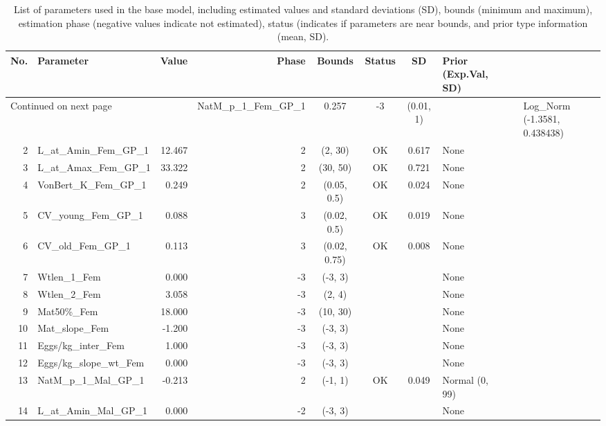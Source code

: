 \documentclass[12pt,]{article}
\begin{document}
\begin{landscape}
\begin{longtable}{rlrrcccl}
\caption{List of parameters used in
                                              the base model, including estimated 
                                              values and standard deviations (SD), 
                                              bounds (minimum and maximum), 
                                              estimation phase (negative values indicate
                                              not estimated), status (indicates if 
                                              parameters are near bounds, and prior type
                                              information (mean, SD).} \\ 
  \hline
No. & Parameter & Value & Phase & Bounds & Status & SD & Prior (Exp.Val, SD)  \\ 
  \hline 
\endhead 
\hline 
\multicolumn{3}{l}{\footnotesize Continued on next page} 
\endfoot 
\endlastfoot 
 \hline
1 & NatM\_p\_1\_Fem\_GP\_1 & 0.257 & -3 & (0.01, 1) &  &  & Log\_Norm (-1.3581, 0.438438) \\ 
  2 & L\_at\_Amin\_Fem\_GP\_1 & 12.467 & 2 & (2, 30) & OK & 0.617 & None \\ 
  3 & L\_at\_Amax\_Fem\_GP\_1 & 33.322 & 2 & (30, 50) & OK & 0.721 & None \\ 
  4 & VonBert\_K\_Fem\_GP\_1 & 0.249 & 2 & (0.05, 0.5) & OK & 0.024 & None \\ 
  5 & CV\_young\_Fem\_GP\_1 & 0.088 & 3 & (0.02, 0.5) & OK & 0.019 & None \\ 
  6 & CV\_old\_Fem\_GP\_1 & 0.113 & 3 & (0.02, 0.75) & OK & 0.008 & None \\ 
  7 & Wtlen\_1\_Fem & 0.000 & -3 & (-3, 3) &  &  & None \\ 
  8 & Wtlen\_2\_Fem & 3.058 & -3 & (2, 4) &  &  & None \\ 
  9 & Mat50\%\_Fem & 18.000 & -3 & (10, 30) &  &  & None \\ 
  10 & Mat\_slope\_Fem & -1.200 & -3 & (-3, 3) &  &  & None \\ 
  11 & Eggs/kg\_inter\_Fem & 1.000 & -3 & (-3, 3) &  &  & None \\ 
  12 & Eggs/kg\_slope\_wt\_Fem & 0.000 & -3 & (-3, 3) &  &  & None \\ 
  13 & NatM\_p\_1\_Mal\_GP\_1 & -0.213 & 2 & (-1, 1) & OK & 0.049 & Normal (0, 99) \\ 
  14 & L\_at\_Amin\_Mal\_GP\_1 & 0.000 & -2 & (-3, 3) &  &  & None \\ 

\end{longtable}
\end{landscape}
\end{document}
